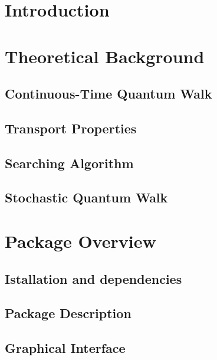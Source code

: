 \documentclass[preprint,12pt]{elsarticle}
\begin{document}
\section{Introduction}
    


\section{Theoretical Background}\label{sec:theor_background}
    
    \subsection{Continuous-Time Quantum Walk}
        
    \subsection{Transport Properties}
        
        
    \subsection{Searching Algorithm}
        \label{sec:theor_searching}
    \subsection{Stochastic Quantum Walk}
        

\section{Package Overview}\label{sec:pack_overview}
    
    \subsection{Istallation and dependencies}
        
    \subsection{Package Description}
        \label{sec:OverviewDescription}
    \subsection{Graphical Interface}
        
\end{document}
